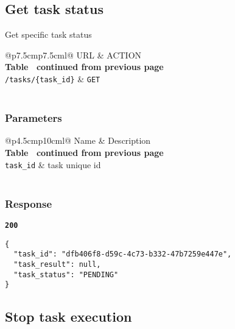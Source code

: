 \subsection{Get task status}
Get specific task status

\begin{longtable}[c]{@{}p{7.5cm}p{7.5cm}l@{}}
  \toprule
  URL                          & ACTION                       \\* \midrule
  \endfirsthead
  \multicolumn{3}{c}%
  {{\bfseries Table \thetable\ continued from previous page}} \\
  \endhead
  \bottomrule
  \endfoot
  \endlastfoot
  \texttt{/tasks/\{task\_id\}} & \texttt{GET}                 \\* \bottomrule
  \label{tab:rdf-validator-get-task}                          \\
\end{longtable}

\subsubsection{Parameters}
\begin{longtable}[c]{@{}p{4.5cm}p{10cm}l@{}}
  \toprule
  Name              & Description                             \\* \midrule
  \endfirsthead
  \multicolumn{3}{c}%
  {{\bfseries Table \thetable\ continued from previous page}} \\
  \endhead
  \bottomrule
  \endfoot
  \endlastfoot
  \texttt{task\_id} & task unique id                          \\* \bottomrule
  \label{tab:rdf-validator-get-task-parameters}               \\
\end{longtable}

\subsubsection{Response}
\textbf{\texttt{200}}
\begin{lstlisting}
{
  "task_id": "dfb406f8-d59c-4c73-b332-47b7259e447e",
  "task_result": null,
  "task_status": "PENDING"
}
\end{lstlisting}

\subsection{Stop task execution}

